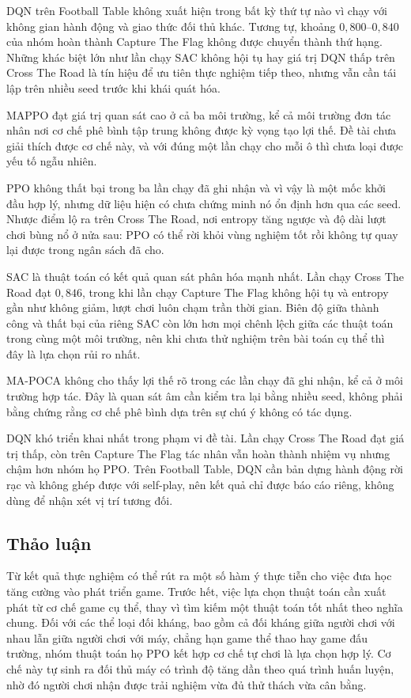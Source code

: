 \indent DQN trên Football Table không xuất hiện trong bất kỳ thứ tự nào vì chạy với không
gian hành động và giao thức đối thủ khác. Tương tự, khoảng $0{,}800$--$0{,}840$ của nhóm
hoàn thành Capture The Flag không được chuyển thành thứ hạng. Những khác biệt lớn như lần
chạy SAC không hội tụ hay giá trị DQN thấp trên Cross The Road là tín hiệu để ưu tiên thực
nghiệm tiếp theo, nhưng vẫn cần tái lập trên nhiều seed trước khi khái quát hóa.

\indent MAPPO đạt giá trị quan sát cao ở cả ba môi trường, kể cả môi trường đơn tác nhân
nơi cơ chế phê bình tập trung không được kỳ vọng tạo lợi thế. Đề tài chưa giải thích được
cơ chế này, và với đúng một lần chạy cho mỗi ô thì chưa loại được yếu tố ngẫu nhiên.

\indent PPO không thất bại trong ba lần chạy đã ghi nhận và vì vậy là một mốc khởi đầu
hợp lý, nhưng dữ liệu hiện có chưa chứng minh nó ổn định hơn qua các seed. Nhược điểm lộ ra trên Cross
The Road, nơi entropy tăng ngược và độ dài lượt chơi bùng nổ ở nửa sau: PPO có thể rời
khỏi vùng nghiệm tốt rồi không tự quay lại được trong ngân sách đã cho.

\indent SAC là thuật toán có kết quả quan sát phân hóa mạnh nhất. Lần chạy Cross The Road
đạt $0{,}846$, trong khi lần chạy Capture The Flag không hội tụ và entropy gần như không
giảm, lượt chơi luôn chạm trần thời gian. Biên độ giữa thành công và thất bại của
riêng SAC còn lớn hơn mọi chênh lệch giữa các thuật toán trong cùng một môi trường, nên
khi chưa thử nghiệm trên bài toán cụ thể thì đây là lựa chọn rủi ro nhất.

\indent MA-POCA không cho thấy lợi thế rõ trong các lần chạy đã ghi nhận, kể cả ở môi
trường hợp tác. Đây là quan sát âm cần kiểm tra lại bằng nhiều seed, không phải bằng chứng
rằng cơ chế phê bình dựa trên sự chú ý không có tác dụng.

\indent DQN khó triển khai nhất trong phạm vi đề tài. Lần chạy Cross The Road đạt giá trị
thấp, còn trên Capture The Flag tác nhân vẫn hoàn thành nhiệm vụ nhưng chậm hơn nhóm họ PPO.
Trên Football Table, DQN cần bản dựng hành động rời rạc và không ghép được với self-play,
nên kết quả chỉ được báo cáo riêng, không dùng để nhận xét vị trí tương đối.

\subsection{Thảo luận}

\indent Từ kết quả thực nghiệm có thể rút ra một số hàm ý thực tiễn cho việc đưa học tăng
cường vào phát triển game. Trước hết, việc lựa chọn thuật toán cần xuất phát từ cơ chế
game cụ thể, thay vì tìm kiếm một thuật toán tốt nhất theo nghĩa chung. Đối với các thể
loại đối kháng, bao gồm cả đối kháng giữa người chơi với nhau lẫn giữa người chơi với máy,
chẳng hạn game thể thao hay game đấu trường, nhóm thuật toán họ PPO kết hợp cơ chế tự chơi
là lựa chọn hợp lý. Cơ chế này tự sinh ra đối thủ máy có trình độ tăng dần theo quá trình
huấn luyện, nhờ đó người chơi nhận được trải nghiệm vừa đủ thử thách vừa cân bằng.

